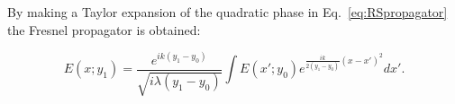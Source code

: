 \documentclass[preprint]{iucr}              %
\begin{document}
By making a Taylor expansion of the quadratic phase in Eq.~\ref{eq:RSpropagator} the Fresnel propagator is obtained: 

\begin{equation}\label{eq:fresnelPropagator}
E(x;y_1) =  \frac{e^{i k (y_1-y_0)}}{\sqrt{i \lambda (y_1-y_0)}} \int E(x';y_0) e^{ \frac{i k}{2 (y_1-y_0)}  (x-x')^2  }  dx'.
\end{equation}


%


%
\end{document}
